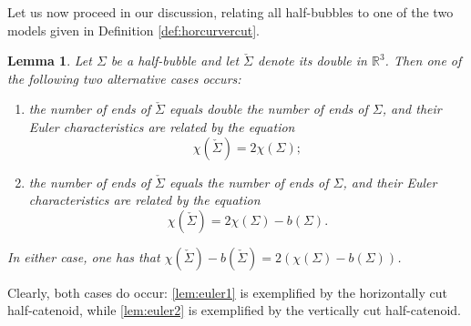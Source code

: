 \documentclass[JEP,XML,SOM,Unicode]{cedram}
\newcounter{cas}
\newtheorem{lem}[thm]{Lemma}
\theoremstyle{definition}
\newcommand{\R}{\mathbb{R}}
\begin{document}
Let us now proceed in our discussion, relating all half-bubbles to one of the two models given in Definition \ref{def:horcurvercut}.

\begin{lem}\label{lem:euler}
Let $\Sigma$ be a half-bubble and let $\check{\Sigma}$ denote its double in $\R^3$. Then one of the following two alternative cases occurs:
\begin{enumerate}
\item\label{lem:euler1}
the number of ends of $\check{\Sigma}$ equals double the number of ends of $\Sigma$, and their Euler characteristics are related by the equation
\[
\chi(\check{\Sigma})=2\chi(\Sigma);
\]

\item\label{lem:euler2}
the number of ends of $\check{\Sigma}$ equals the number of ends of $\Sigma$, and their Euler characteristics are related by the equation
\[
\chi(\check{\Sigma})=2\chi(\Sigma)-b(\Sigma).
\]
\end{enumerate}
In either case, one has that $\chi(\check{\Sigma})-b(\check{\Sigma})=2(\chi(\Sigma)-b(\Sigma))$.
\end{lem}

Clearly, both cases do occur: \eqref{lem:euler1} is exemplified by the horizontally cut half-catenoid, while \eqref{lem:euler2} is exemplified by the vertically cut half-catenoid.
\end{document}
